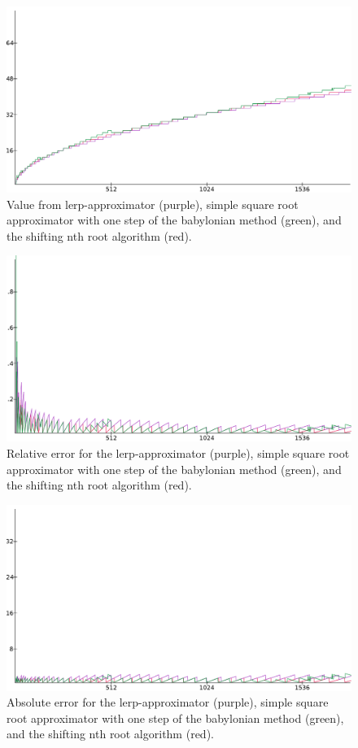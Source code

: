 		\begin{figure}[H] \centering
		\includegraphics[width=0.75\linewidth]{figure/value_lin12x.png}
		\caption{Value from lerp-approximator (purple), simple square root
		approximator with one step of the babylonian method (green), and the
		shifting nth root algorithm (red).} \label{sres4} \end{figure}

		\begin{figure}[H] \centering
		\includegraphics[width=0.75\linewidth]{figure/rel_lin960x.png}
		\caption{Relative error for the lerp-approximator (purple), simple
		square root approximator with one step of the babylonian method
		(green), and the shifting nth root algorithm (red).} \label{sres5}
		\end{figure}

		\begin{figure}[H] \centering
		\includegraphics[width=0.75\linewidth]{figure/abs_lin24x.png}
		\caption{Absolute error for the lerp-approximator (purple), simple
		square root approximator with one step of the babylonian method
		(green), and the shifting nth root algorithm (red).} \label{sres6}
		\end{figure}

